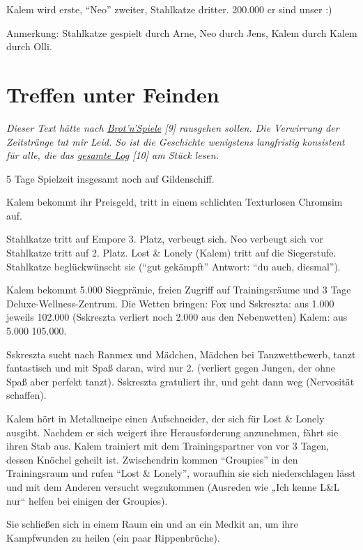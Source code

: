\documentclass[11pt]{scrartcl}
\begin{document}
Kalem wird erste, ``Neo'' zweiter, Stahlkatze dritter. 200.000 cr sind
unser :)

Anmerkung: Stahlkatze gespielt durch Arne, Neo durch Jens, Kalem durch
Kalem durch Olli.

\section{Treffen unter Feinden}

\emph{Dieser Text hätte nach
\href{http://1w6.org/deutsch/kampagnen/waechter-der-zeit/gedaechtniskristall/brot-n-spiele}{Brot'n'Spiele}
{[}9{]} rausgehen sollen. Die Verwirrung der Zeitstränge tut mir Leid.
So ist die Geschichte wenigstens langfristig konsistent für alle, die
das
\href{http://1w6.org/deutsch/kampagnen/friedenszwang/aufzeichnungen/sskreszta-log}{gesamte
Log} {[}10{]} am Stück lesen.}

5 Tage Spielzeit insgesamt noch auf Gildenschiff.

Kalem bekommt ihr Preisgeld, tritt in einem schlichten Texturlosen
Chromsim auf.

Stahlkatze tritt auf Empore 3. Platz, verbeugt sich. Neo verbeugt sich
vor Stahlkatze tritt auf 2. Platz. Lost \& Lonely (Kalem) tritt auf die
Siegerstufe. Stahlkatze beglückwünscht sie (``gut gekämpft'' Antwort:
``du auch, diesmal'').

Kalem bekommt 5.000 Siegprämie, freien Zugriff auf Trainingsräume und 3
Tage Deluxe-Wellness-Zentrum. Die Wetten bringen: Fox und Sskreszta: aus
1.000 jeweils 102.000 (Sskreszta verliert noch 2.000 aus den
Nebenwetten) Kalem: aus 5.000 105.000.

Sskreszta sucht nach Ranmex und Mädchen, Mädchen bei Tanzwettbewerb,
tanzt fantastisch und mit Spaß daran, wird nur 2. (verliert gegen
Jungen, der ohne Spaß aber perfekt tanzt). Sskreszta gratuliert ihr, und
geht dann weg (Nervosität schaffen).

Kalem hört in Metalkneipe einen Aufschneider, der sich für Lost \&
Lonely ausgibt. Nachdem er sich weigert ihre Herausforderung anzunehmen,
fährt sie ihren Stab aus. Kalem trainiert mit dem Trainingspartner von
vor 3 Tagen, dessen Knöchel geheilt ist. Zwischendrin kommen
``Groupies'' in den Trainingsraum und rufen ``Lost \& Lonely'',
woraufhin sie sich niederschlagen lässt und mit dem Anderen versucht
wegzukommen (Ausreden wie „Ich kenne L\&L nur`` helfen bei einigen der
Groupies).

Sie schließen sich in einem Raum ein und an ein Medkit an, um ihre
Kampfwunden zu heilen (ein paar Rippenbrüche).
\end{document}
